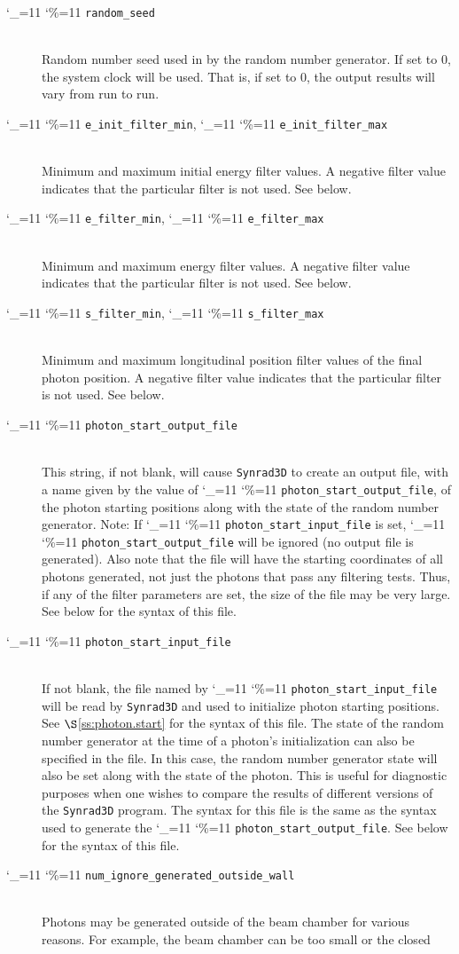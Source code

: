 \documentclass[11pt]{article}
\newcommand{\sref}[1]{$\S$\ref{#1}}
\newcommand{\srthree}{\texttt{Synrad3D}\xspace}
\newcommand\ttcmd{\begingroup\catcode`\_=11 \catcode`\%=11 \dottcmd}
\newcommand\dottcmd[1]{\texttt{#1}\endgroup}
\newcommand{\vn}{\ttcmd}
\newcommand{\Newline}{\hfil \\}
\begin{document}
\begin{description}
  \item[\vn{random_seed}] \Newline
Random number seed used in by the random number generator. If set to 0, the system clock
will be used. That is, if set to 0, the output results will vary from run to run. 
  \item[\vn{e_init_filter_min}, \vn{e_init_filter_max}] \Newline
Minimum and maximum initial energy filter values. A negative filter value
indicates that the particular filter is not used. See below.
  \item[\vn{e_filter_min}, \vn{e_filter_max}] \Newline
Minimum and maximum energy filter values. A negative filter value
indicates that the particular filter is not used. See below.
  \item[\vn{s_filter_min}, \vn{s_filter_max}] \Newline
Minimum and maximum longitudinal position filter values of the final
photon position. A negative filter value indicates that the particular
filter is not used. See below.
  \item[\vn{photon_start_output_file}] \Newline
This string, if not blank, will cause \srthree to create an output
file, with a name given by the value of \vn{photon_start_output_file},
of the photon starting positions along with the state of the random
number generator. Note: If \vn{photon_start_input_file} is set,
\vn{photon_start_output_file} will be ignored (no output file is
generated). Also note that the file will have the starting coordinates
of all photons generated, not just the photons that pass any filtering
tests. Thus, if any of the filter parameters are set, the size of the
file may be very large. See below for the syntax of this file.
  \item[\vn{photon_start_input_file}] \Newline
If not blank, the file named by \vn{photon_start_input_file}
will be read by \srthree and used to initialize photon
starting positions. See \sref{ss:photon.start} for the syntax of this file.
The state of the random number generator at the time of a photon's
initialization can also be specified in the file. In this case, the
random number generator state will also be set along with the state of
the photon. This is useful for diagnostic purposes when one wishes to
compare the results of different versions of the \srthree program. The
syntax for this file is the same as the syntax used to generate the
\vn{photon_start_output_file}. See below for the syntax of this file.
  \item[\vn{num_ignore_generated_outside_wall}] \Newline
Photons may be generated outside of the beam chamber for various
reasons. For example, the beam chamber can be too small or the closed

\end{description}
\end{document}
